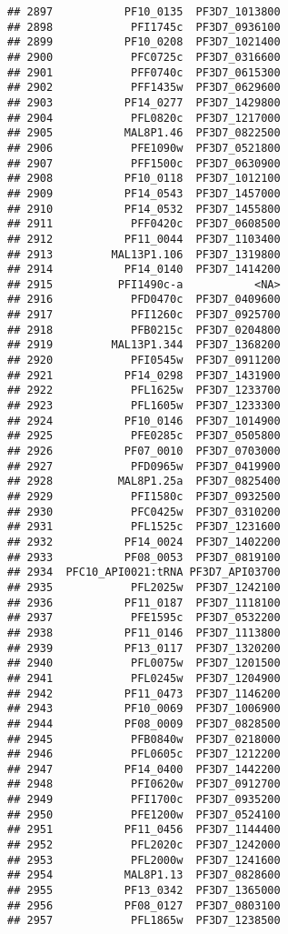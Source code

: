 \documentclass[12pt, a4paper]{article}\usepackage[]{graphicx}\usepackage[]{color}
\makeatletter
\newenvironment{kframe}{%
 \def\at@end@of@kframe{}%
 \ifinner\ifhmode%
  \def\at@end@of@kframe{\end{minipage}}%
  \begin{minipage}{\columnwidth}%
 \fi\fi%
 \def\FrameCommand##1{\hskip\@totalleftmargin \hskip-\fboxsep
 \colorbox{shadecolor}{##1}\hskip-\fboxsep
     \hskip-\linewidth \hskip-\@totalleftmargin \hskip\columnwidth}%
 \MakeFramed {\advance\hsize-\width
   \@totalleftmargin\z@ \linewidth\hsize
   \@setminipage}}%
 {\par\unskip\endMakeFramed%
 \at@end@of@kframe}
\newenvironment{knitrout}{}{} %
\makeatother
\begin{document}
\begin{knitrout}
\begin{kframe}
\begin{verbatim}
## 2897           PF10_0135  PF3D7_1013800
## 2898            PFI1745c  PF3D7_0936100
## 2899           PF10_0208  PF3D7_1021400
## 2900            PFC0725c  PF3D7_0316600
## 2901            PFF0740c  PF3D7_0615300
## 2902            PFF1435w  PF3D7_0629600
## 2903           PF14_0277  PF3D7_1429800
## 2904            PFL0820c  PF3D7_1217000
## 2905           MAL8P1.46  PF3D7_0822500
## 2906            PFE1090w  PF3D7_0521800
## 2907            PFF1500c  PF3D7_0630900
## 2908           PF10_0118  PF3D7_1012100
## 2909           PF14_0543  PF3D7_1457000
## 2910           PF14_0532  PF3D7_1455800
## 2911            PFF0420c  PF3D7_0608500
## 2912           PF11_0044  PF3D7_1103400
## 2913         MAL13P1.106  PF3D7_1319800
## 2914           PF14_0140  PF3D7_1414200
## 2915          PFI1490c-a           <NA>
## 2916            PFD0470c  PF3D7_0409600
## 2917            PFI1260c  PF3D7_0925700
## 2918            PFB0215c  PF3D7_0204800
## 2919         MAL13P1.344  PF3D7_1368200
## 2920            PFI0545w  PF3D7_0911200
## 2921           PF14_0298  PF3D7_1431900
## 2922            PFL1625w  PF3D7_1233700
## 2923            PFL1605w  PF3D7_1233300
## 2924           PF10_0146  PF3D7_1014900
## 2925            PFE0285c  PF3D7_0505800
## 2926           PF07_0010  PF3D7_0703000
## 2927            PFD0965w  PF3D7_0419900
## 2928          MAL8P1.25a  PF3D7_0825400
## 2929            PFI1580c  PF3D7_0932500
## 2930            PFC0425w  PF3D7_0310200
## 2931            PFL1525c  PF3D7_1231600
## 2932           PF14_0024  PF3D7_1402200
## 2933           PF08_0053  PF3D7_0819100
## 2934  PFC10_API0021:tRNA PF3D7_API03700
## 2935            PFL2025w  PF3D7_1242100
## 2936           PF11_0187  PF3D7_1118100
## 2937            PFE1595c  PF3D7_0532200
## 2938           PF11_0146  PF3D7_1113800
## 2939           PF13_0117  PF3D7_1320200
## 2940            PFL0075w  PF3D7_1201500
## 2941            PFL0245w  PF3D7_1204900
## 2942           PF11_0473  PF3D7_1146200
## 2943           PF10_0069  PF3D7_1006900
## 2944           PF08_0009  PF3D7_0828500
## 2945            PFB0840w  PF3D7_0218000
## 2946            PFL0605c  PF3D7_1212200
## 2947           PF14_0400  PF3D7_1442200
## 2948            PFI0620w  PF3D7_0912700
## 2949            PFI1700c  PF3D7_0935200
## 2950            PFE1200w  PF3D7_0524100
## 2951           PF11_0456  PF3D7_1144400
## 2952            PFL2020c  PF3D7_1242000
## 2953            PFL2000w  PF3D7_1241600
## 2954           MAL8P1.13  PF3D7_0828600
## 2955           PF13_0342  PF3D7_1365000
## 2956           PF08_0127  PF3D7_0803100
## 2957            PFL1865w  PF3D7_1238500

\end{verbatim}
\end{kframe}
\end{knitrout}
\end{document}
